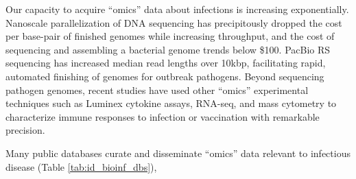 Our capacity to acquire “omics” data about infections is increasing exponentially. Nanoscale parallelization of DNA sequencing has precipitously dropped the cost per base-pair of finished genomes while increasing throughput, and the cost of sequencing and assembling a bacterial genome trends below \$100.\autocite{Didelot2012} PacBio RS sequencing has increased median read lengths over 10kbp, facilitating rapid, automated finishing of genomes for outbreak pathogens.\autocite{Chin2011,Rasko2011} Beyond sequencing pathogen genomes, recent studies have used other “omics” experimental techniques such as Luminex cytokine assays, RNA-seq, and mass cytometry to characterize immune responses to infection or vaccination with remarkable precision.\autocite{Mejias2014,Querec2009}

Many public databases curate and disseminate “omics” data relevant to infectious disease (Table \ref{tab:id_bioinf_dbs}), 
